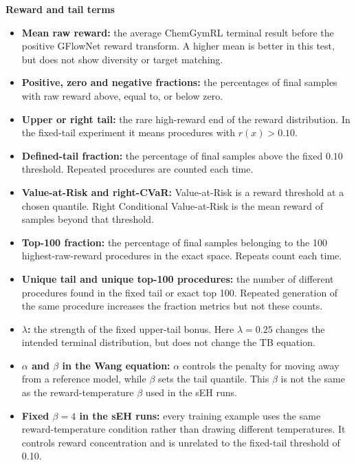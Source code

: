 \documentclass{article}
\begin{document}
\textbf{Reward and tail terms}
\begin{itemize}
    \item \textbf{Mean raw reward:} the average ChemGymRL terminal result before the positive GFlowNet reward transform. A higher mean is better in this test, but does not show diversity or target matching.
    \item \textbf{Positive, zero and negative fractions:} the percentages of final samples with raw reward above, equal to, or below zero.
    \item \textbf{Upper or right tail:} the rare high-reward end of the reward distribution. In the fixed-tail experiment it means procedures with $r(x)>0.10$.
    \item \textbf{Defined-tail fraction:} the percentage of final samples above the fixed $0.10$ threshold. Repeated procedures are counted each time.
    \item \textbf{Value-at-Risk and right-CVaR:} Value-at-Risk is a reward threshold at a chosen quantile. Right Conditional Value-at-Risk is the mean reward of samples beyond that threshold.
    \item \textbf{Top-100 fraction:} the percentage of final samples belonging to the 100 highest-raw-reward procedures in the exact space. Repeats count each time.
    \item \textbf{Unique tail and unique top-100 procedures:} the number of different procedures found in the fixed tail or exact top 100. Repeated generation of the same procedure increases the fraction metrics but not these counts.
    \item \textbf{$\lambda$:} the strength of the fixed upper-tail bonus. Here $\lambda=0.25$ changes the intended terminal distribution, but does not change the TB equation.
    \item \textbf{$\alpha$ and $\beta$ in the Wang equation:} $\alpha$ controls the penalty for moving away from a reference model, while $\beta$ sets the tail quantile. This $\beta$ is not the same as the reward-temperature $\beta$ used in the sEH runs.
    \item \textbf{Fixed $\beta=4$ in the sEH runs:} every training example uses the same reward-temperature condition rather than drawing different temperatures. It controls reward concentration and is unrelated to the fixed-tail threshold of 0.10.
\end{itemize}
\end{document}
